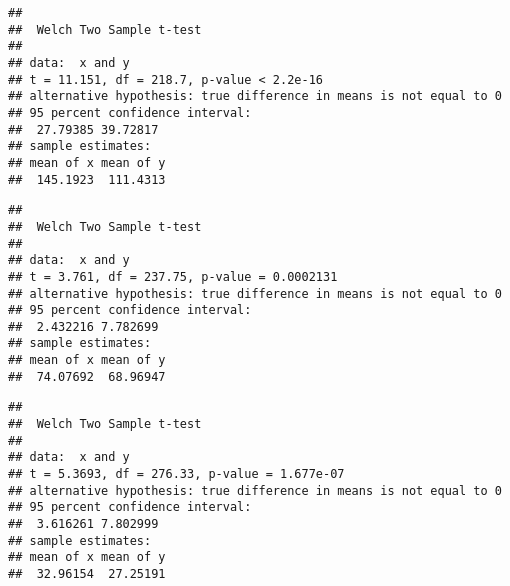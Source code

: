\documentclass[
]{article}
\newenvironment{Shaded}{\begin{snugshade}}{\end{snugshade}}
\newcommand{\FunctionTok}[1]{\textcolor[rgb]{0.00,0.00,0.00}{#1}}
\newcommand{\NormalTok}[1]{#1}
\newcommand{\SpecialCharTok}[1]{\textcolor[rgb]{0.00,0.00,0.00}{#1}}
\begin{document}
\begin{Shaded}
\end{Shaded}

\begin{verbatim}
## 
##  Welch Two Sample t-test
## 
## data:  x and y
## t = 11.151, df = 218.7, p-value < 2.2e-16
## alternative hypothesis: true difference in means is not equal to 0
## 95 percent confidence interval:
##  27.79385 39.72817
## sample estimates:
## mean of x mean of y 
##  145.1923  111.4313
\end{verbatim}

\begin{Shaded}
\end{Shaded}

\begin{verbatim}
## 
##  Welch Two Sample t-test
## 
## data:  x and y
## t = 3.761, df = 237.75, p-value = 0.0002131
## alternative hypothesis: true difference in means is not equal to 0
## 95 percent confidence interval:
##  2.432216 7.782699
## sample estimates:
## mean of x mean of y 
##  74.07692  68.96947
\end{verbatim}

\begin{Shaded}
\end{Shaded}

\begin{verbatim}
## 
##  Welch Two Sample t-test
## 
## data:  x and y
## t = 5.3693, df = 276.33, p-value = 1.677e-07
## alternative hypothesis: true difference in means is not equal to 0
## 95 percent confidence interval:
##  3.616261 7.802999
## sample estimates:
## mean of x mean of y 
##  32.96154  27.25191
\end{verbatim}

\begin{Shaded}
\end{Shaded}
\end{document}
